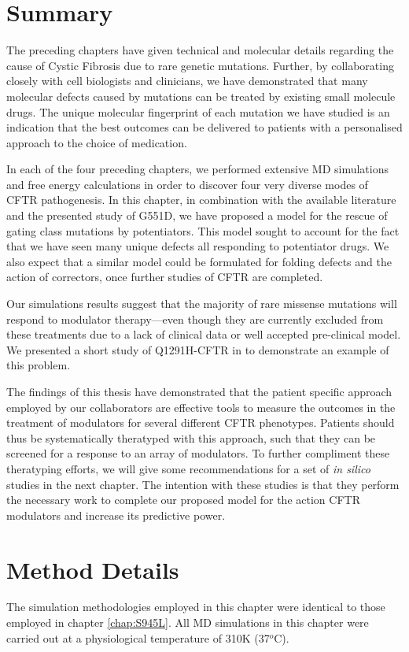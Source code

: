 \section{Summary}
The preceding chapters have given technical and molecular details regarding the cause of Cystic Fibrosis due to rare genetic mutations. Further, by collaborating closely with cell biologists and clinicians, we have demonstrated that many molecular defects caused by mutations can be treated by existing small molecule drugs. The unique molecular fingerprint of each mutation we have studied is an indication that the best outcomes can be delivered to patients with a personalised approach to the choice of medication. 

In each of the four preceding chapters, we performed extensive MD simulations and free energy calculations in order to discover four very diverse modes of CFTR pathogenesis. In this chapter, in combination with the available literature and the presented study of G551D, we have proposed a model for the rescue of gating class mutations by potentiators. This model sought to account for the fact that we have seen many unique defects all responding to potentiator drugs. We also expect that a similar model could be formulated for folding defects and the action of correctors, once further studies of CFTR are completed. 

Our simulations results suggest that the majority of rare missense mutations will respond to modulator therapy---even though they are currently excluded from these treatments due to a lack of clinical data or well accepted pre-clinical model. We presented a short study of Q1291H-CFTR in to demonstrate an example of this problem. 

The findings of this thesis have demonstrated that the patient specific approach employed by our collaborators are effective tools to measure the outcomes in the treatment of modulators for several different CFTR phenotypes. Patients should thus be systematically theratyped with this approach, such that they can be screened for a response to an array of modulators. To further compliment these theratyping efforts, we will give some recommendations for a set of \textit{in silico} studies in the next chapter. The intention with these studies is that they perform the necessary work to complete our proposed model for the action CFTR modulators and  increase its predictive power.



\section{Method Details}
The simulation methodologies employed in this chapter were identical to those employed in chapter \ref{chap:S945L}. All MD simulations in this chapter were carried out at a physiological temperature of 310K (37$^o$C).
